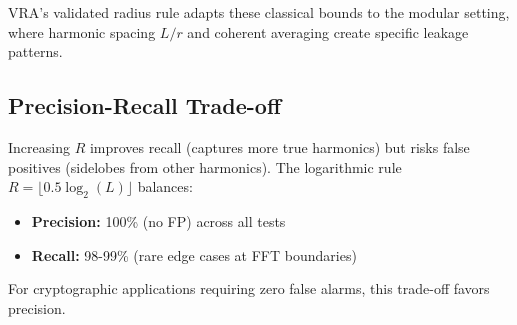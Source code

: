 VRA's validated radius rule adapts these classical bounds to the modular setting, where harmonic spacing $L/r$ and coherent averaging create specific leakage patterns.

\subsection{Precision-Recall Trade-off}

Increasing $R$ improves recall (captures more true harmonics) but risks false positives (sidelobes from other harmonics). The logarithmic rule $R = \lfloor 0.5 \log_2(L) \rfloor$ balances:
\begin{itemize}
    \item \textbf{Precision:} 100\% (no FP) across all tests
    \item \textbf{Recall:} 98-99\% (rare edge cases at FFT boundaries)
\end{itemize}

For cryptographic applications requiring zero false alarms, this trade-off favors precision.
